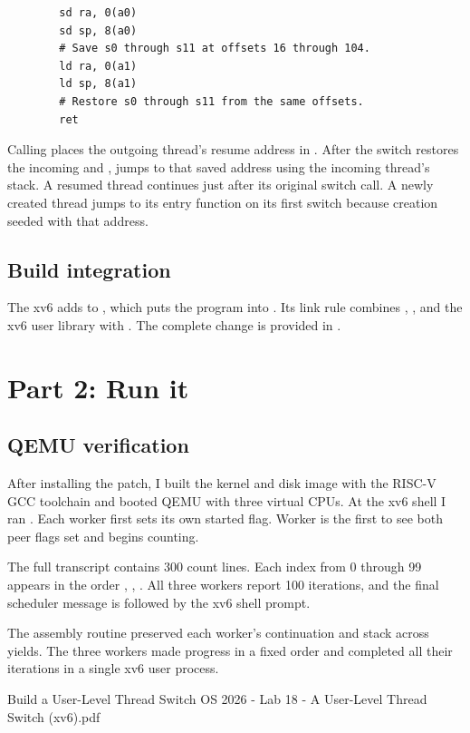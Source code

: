 \documentclass{../latex/utmreport}
\begin{document}
\begin{lstlisting}
        sd ra, 0(a0)
        sd sp, 8(a0)
        # Save s0 through s11 at offsets 16 through 104.
        ld ra, 0(a1)
        ld sp, 8(a1)
        # Restore s0 through s11 from the same offsets.
        ret
\end{lstlisting}

Calling  places the outgoing thread's resume address in . After the switch restores the incoming  and ,  jumps to that saved address using the incoming thread's stack. A resumed thread continues just after its original switch call. A newly created thread jumps to its entry function on its first switch because creation seeded  with that address.

\section{Build integration}
The xv6  adds  to , which puts the program into . Its link rule combines , , and the xv6 user library with . The complete change is provided in .

\chapter{Part 2: Run it}

\section{QEMU verification}
After installing the patch, I built the kernel and disk image with the RISC-V GCC toolchain and booted QEMU with three virtual CPUs. At the xv6 shell I ran . Each worker first sets its own started flag. Worker  is the first to see both peer flags set and begins counting.



The full transcript contains 300 count lines. Each index from 0 through 99 appears in the order , , . All three workers report 100 iterations, and the final scheduler message is followed by the xv6 shell prompt.



\utmconclusions
The assembly routine preserved each worker's continuation and stack across yields. The three workers made progress in a fixed order and completed all their iterations in a single xv6 user process.

\reportreferences
  {Build a User-Level Thread Switch}
  {OS 2026 - Lab 18 - A User-Level Thread Switch (xv6).pdf}
\end{document}
